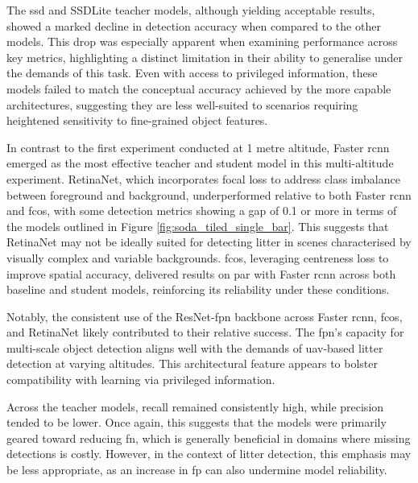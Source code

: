 The \gls{ssd} and SSDLite teacher models, although yielding acceptable results, showed a marked decline in detection accuracy when compared to the other models. This drop was especially apparent when examining performance across key metrics, highlighting a distinct limitation in their ability to generalise under the demands of this task. Even with access to privileged information, these models failed to match the conceptual accuracy achieved by the more capable architectures, suggesting they are less well-suited to scenarios requiring heightened sensitivity to fine-grained object features.

In contrast to the first experiment conducted at 1 metre altitude, Faster \gls{rcnn} emerged as the most effective teacher and student model in this multi-altitude experiment. RetinaNet, which incorporates focal loss to address class imbalance between foreground and background, underperformed relative to both Faster \gls{rcnn} and \gls{fcos}, with some detection metrics showing a gap of 0.1 or more in terms of the models outlined in Figure \ref{fig:soda_tiled_single_bar}. This suggests that RetinaNet may not be ideally suited for detecting litter in scenes characterised by visually complex and variable backgrounds. \gls{fcos}, leveraging centreness loss to improve spatial accuracy, delivered results on par with Faster \gls{rcnn} across both baseline and student models, reinforcing its reliability under these conditions.

Notably, the consistent use of the ResNet-\gls{fpn} backbone across Faster \gls{rcnn}, \gls{fcos}, and RetinaNet likely contributed to their relative success. The \gls{fpn}’s capacity for multi-scale object detection aligns well with the demands of \gls{uav}-based litter detection at varying altitudes. This architectural feature appears to bolster compatibility with learning via privileged information.

Across the teacher models, recall remained consistently high, while precision tended to be lower. Once again, this suggests that the models were primarily geared toward reducing \gls{fn}, which is generally beneficial in domains where missing detections is costly. However, in the context of litter detection, this emphasis may be less appropriate, as an increase in \gls{fp} can also undermine model reliability.





